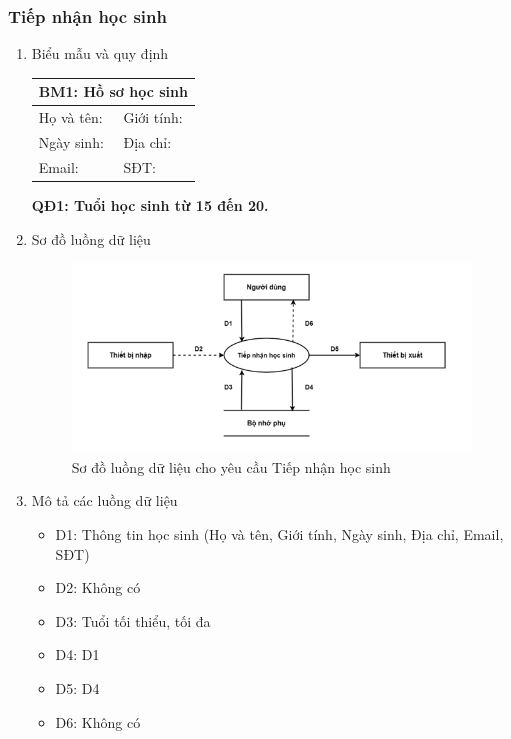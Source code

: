 \documentclass[a4paper]{article}
\begin{document}
		\subsubsection{Tiếp nhận học sinh}
		
\begin{enumerate}[label=\alph*.] 
\item Biểu mẫu và quy định
\begin{table}[H]
    \centering
    \renewcommand{\arraystretch}{1.5}
    \begin{tabular}{|p{5cm}<{\raggedright}|p{5cm}<{\raggedright}|} %
    \hline
    \multicolumn{2}{|c|}{ \textbf{BM1: Hồ sơ học sinh}} \\ %
    \hline
    Họ và tên: \dotfill & Giới tính: \dotfill \\ 
    \hline
    Ngày sinh: \dotfill & Địa chỉ: \dotfill \\ 
    \hline
    Email: \dotfill & SĐT: \dotfill \\ 
    \hline
    \end{tabular}
\end{table}
	
\textbf{QĐ1: Tuổi học sinh từ 15 đến 20.} 

\item Sơ đồ luồng dữ liệu
\begin{figure}[H] 
    \centering
    \includegraphics[width=1\textwidth]{dfd1} %
    \caption{Sơ đồ luồng dữ liệu cho yêu cầu Tiếp nhận học sinh}
\end{figure}


\item Mô tả các luồng dữ liệu
\begin{itemize}
\item D1: Thông tin học sinh (Họ và tên, Giới tính, Ngày sinh, Địa chỉ, Email, SĐT)
\item D2: Không có
\item D3: Tuổi tối thiểu, tối đa
\item D4: D1 
\item D5: D4
\item D6: Không có
\end{itemize}


\end{enumerate}
\end{document}
